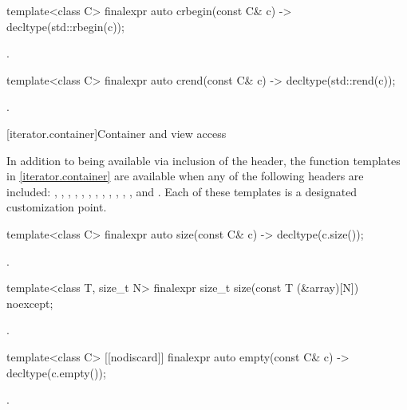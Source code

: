 %
\begin{itemdecl}
template<class C> finalexpr auto crbegin(const C& c) -> decltype(std::rbegin(c));
\end{itemdecl}
\begin{itemdescr}
\pnum \returns {}.
\end{itemdescr}

%
\begin{itemdecl}
template<class C> finalexpr auto crend(const C& c) -> decltype(std::rend(c));
\end{itemdecl}
\begin{itemdescr}
\pnum \returns {}.
\end{itemdescr}

[iterator.container]{Container and view access}

\pnum
In addition to being available via inclusion of the  header,
the function templates in \ref{iterator.container} are available
when any of the following headers are included:
, , , ,
, , , , ,
, , , and .
Each of these templates
is a designated customization point.

%
\begin{itemdecl}
template<class C> finalexpr auto size(const C& c) -> decltype(c.size());
\end{itemdecl}
\begin{itemdescr}
\pnum \returns {}.
\end{itemdescr}

%
\begin{itemdecl}
template<class T, size_t N> finalexpr size_t size(const T (&array)[N]) noexcept;
\end{itemdecl}
\begin{itemdescr}
\pnum \returns {}.
\end{itemdescr}

%
\begin{itemdecl}
template<class C> [[nodiscard]] finalexpr auto empty(const C& c) -> decltype(c.empty());
\end{itemdecl}
\begin{itemdescr}
\pnum \returns {}.
\end{itemdescr}

